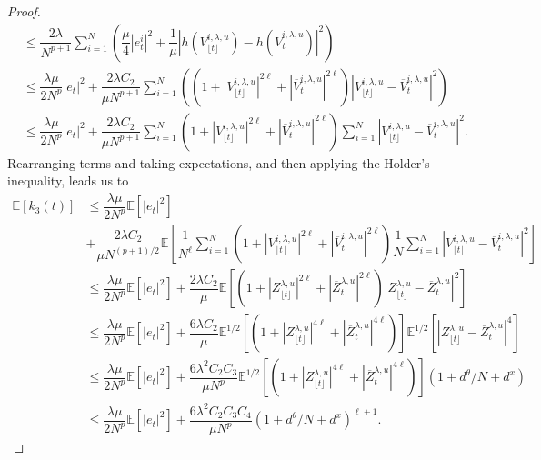 \documentclass[a4paper, 10pt]{article}
\theoremstyle{plain}%
\begin{document}
\begin{proof}
\begin{align*}
&\leq\dfrac{2\lambda}{N^{p+1}}\sum_{i=1}^N\left(\dfrac{\mu}{4}|e_t^i|^2+\dfrac{1}{\mu}| h(V_{\lfloor{t}\rfloor}^{i,\lambda,u})-h(\overline{V}_{t}^{i,\lambda,u})|^2\right)\\
&\leq\dfrac{\lambda\mu}{2N^p}|e_t|^2+\dfrac{2\lambda C_2}{\mu N^{p+1}}\sum_{i=1}^N \left((1+|V_{\lfloor{t}\rfloor}^{i,\lambda,u}|^{2\ell}+|\overline{V}_{t}^{i,\lambda,u}|^{2\ell})|V_{\lfloor{t}\rfloor}^{i,\lambda,u}-\overline{V}_{t}^{i,\lambda,u}|^2\right)\\
&\leq\dfrac{\lambda\mu}{2N^p}|e_t|^2+\dfrac{2\lambda C_2}{\mu N^{p+1}}\sum_{i=1}^N \left(1+|V_{\lfloor{t}\rfloor}^{i,\lambda,u}|^{2\ell}+|\overline{V}_{t}^{i,\lambda,u}|^{2\ell}\right)\sum_{i=1}^N|V_{\lfloor{t}\rfloor}^{i,\lambda,u}-\overline{V}_{t}^{i,\lambda,u}|^2.
\end{align*}
Rearranging terms and taking expectations, and then applying the Holder's inequality, leads us to
\begin{align}
\mathbb{E}\left[k_3(t)\right]&\leq \dfrac{\lambda\mu}{2N^p}\mathbb{E}\left[|e_t|^2\right]\nonumber\\
&+\dfrac{2\lambda C_2}{\mu N^{(p+1)/2}}\mathbb{E}\left[\dfrac{1}{N^{\ell}}\sum_{i=1}^N \left(1+|V_{\lfloor{t}\rfloor}^{i,\lambda,u}|^{2\ell}+|\overline{V}_{t}^{i,\lambda,u}|^{2\ell}\right)\dfrac{1}{N}\sum_{i=1}^N|V_{\lfloor{t}\rfloor}^{i,\lambda,u}-\overline{V}_{t}^{i,\lambda,u}|^2\right]\nonumber\\
&\leq\dfrac{\lambda\mu}{2N^p}\mathbb{E}\left[|e_t|^2\right]+\dfrac{2\lambda C_2}{\mu}\mathbb{E}\left[\left(1+|Z_{\lfloor{t}\rfloor}^{\lambda,u}|^{2\ell}+|\overline{Z}_{t}^{\lambda,u}|^{2\ell}\right)|Z_{\lfloor{t}\rfloor}^{\lambda,u}-\overline{Z}_{t}^{\lambda,u}|^2\right]\nonumber\\
&\leq\dfrac{\lambda\mu}{2N^p}\mathbb{E}\left[|e_t|^2\right]+\dfrac{6\lambda C_2}{\mu}\mathbb{E}^{1/2}\left[\left(1+|Z_{\lfloor{t}\rfloor}^{\lambda,u}|^{4\ell}+|\overline{Z}_{t}^{\lambda,u}|^{4\ell}\right)\right]\mathbb{E}^{1/2}\left[|Z_{\lfloor{t}\rfloor}^{\lambda,u}-\overline{Z}_{t}^{\lambda,u}|^4\right]\nonumber\\
&\leq\dfrac{\lambda\mu}{2N^p}\mathbb{E}\left[|e_t|^2\right]+\dfrac{6\lambda^2 C_2C_3}{\mu N^p}\mathbb{E}^{1/2}\left[\left(1+|Z_{\lfloor{t}\rfloor}^{\lambda,u}|^{4\ell}+|\overline{Z}_{t}^{\lambda,u}|^{4\ell}\right)\right](1+d^{\theta}/N+d^x)\nonumber\\
&\leq\dfrac{\lambda\mu}{2N^p}\mathbb{E}\left[|e_t|^2\right]+\dfrac{6\lambda^2 C_2C_3C_4}{\mu N^p}(1+d^{\theta}/N+d^x)^{\ell+1}.\label{c4}
\end{align}

\end{proof}
\end{document}
